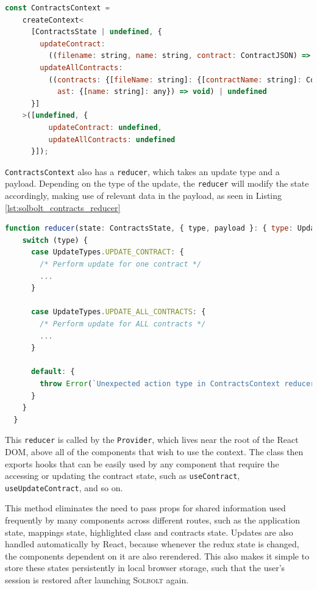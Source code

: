\begin{lstlisting}[language=Javascript, caption={\texttt{ContractsContext} used for managing contract state}, label={lst:solbolt_contracts_context}, basicstyle=\ttfamily\scriptsize]
  const ContractsContext = 
    createContext<
      [ContractsState | undefined, {
        updateContract: 
          ((filename: string, name: string, contract: ContractJSON) => void) | undefined, 
        updateAllContracts: 
          ((contracts: {[fileName: string]: {[contractName: string]: ContractJSON}}, 
            ast: {[name: string]: any}) => void) | undefined
      }]
    >([undefined, {
          updateContract: undefined, 
          updateAllContracts: undefined
      }]);
\end{lstlisting}

\texttt{ContractsContext} also has a \texttt{reducer}, which takes an update type and a payload.
Depending on the type of the update, the \texttt{reducer} will modify the state accordingly,
making use of relevant data in the payload, as seen in Listing \ref{lst:solbolt_contracts_reducer}

\begin{lstlisting}[language=Javascript, caption={Reducer used in \texttt{ContractsContext}}, label={lst:solbolt_contracts_reducer}, basicstyle=\ttfamily\scriptsize]
  function reducer(state: ContractsState, { type, payload }: { type: UpdateTypes, payload: PayloadType | undefined}) {
    switch (type) {
      case UpdateTypes.UPDATE_CONTRACT: {
        /* Perform update for one contract */
        ...
      }

      case UpdateTypes.UPDATE_ALL_CONTRACTS: {
        /* Perform update for ALL contracts */
        ...
      }

      default: {
        throw Error(`Unexpected action type in ContractsContext reducer: '${type}'.`)
      }
    }
  }
\end{lstlisting}

This \texttt{reducer} is called by the \texttt{Provider}, which lives near the root of
the React DOM, above all of the components that wish to use the context. The class then exports
hooks that can be easily used by any component that require the accessing or updating 
the contract state, such as \texttt{useContract}, \texttt{useUpdateContract}, and so on.

This method eliminates the need to pass props for shared information used frequently by many
components across different routes, such as the application state, mappings state, highlighted class and
contracts state. Updates are also handled automatically by React, because whenever the 
redux state is changed, the components dependent on it are also rerendered.
This also makes it simple to store these states persistently in local
browser storage, such that the user's session is restored after launching \textcolor{NavyBlue}{\textsc{Solbolt}} again.

